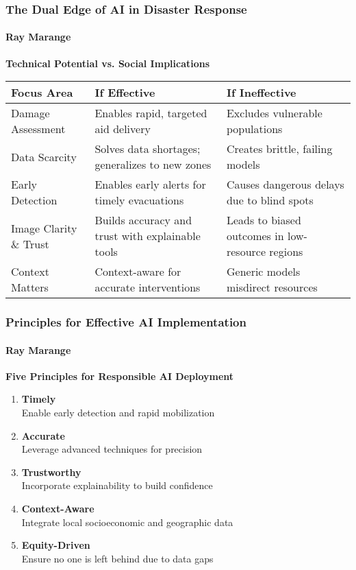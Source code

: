 \documentclass{beamer}
\newcommand{\namedframe}[3]{
  \begin{frame}
    \frametitle{#2}
    \framesubtitle{#1}
    #3
  \end{frame}
}
\begin{document}
\namedframe{Ray Marange}{The Dual Edge of AI in Disaster Response}{
\textbf{Technical Potential vs. Social Implications}
\begin{table}[]
  \scriptsize
  \centering
  \begin{tabular}{p{2.2cm} p{4.5cm} p{4.5cm}}
    \toprule
    \textbf{Focus Area} & \textbf{If Effective} & \textbf{If Ineffective} \\
    \midrule
    Damage Assessment & Enables rapid, targeted aid delivery & Excludes vulnerable populations \\
    \midrule
    Data Scarcity & Solves data shortages; generalizes to new zones & Creates brittle, failing models \\
    \midrule
    Early Detection & Enables early alerts for timely evacuations & Causes dangerous delays due to blind spots \\
    \midrule
    Image Clarity \& Trust & Builds accuracy and trust with explainable tools & Leads to biased outcomes in low-resource regions \\
    \midrule
    Context Matters & Context-aware for accurate interventions & Generic models misdirect resources \\
    \bottomrule
  \end{tabular}
\end{table}
}

\namedframe{Ray Marange}{Principles for Effective AI Implementation}{
\textbf{Five Principles for Responsible AI Deployment}

\begin{enumerate}
  \item \textbf{Timely} \\ Enable early detection and rapid mobilization

  \item \textbf{Accurate} \\ Leverage advanced techniques for precision

  \item \textbf{Trustworthy} \\ Incorporate explainability to build confidence

  \item \textbf{Context-Aware} \\ Integrate local socioeconomic and geographic data

  \item \textbf{Equity-Driven} \\ Ensure no one is left behind due to data gaps
\end{enumerate}
}
\end{document}
